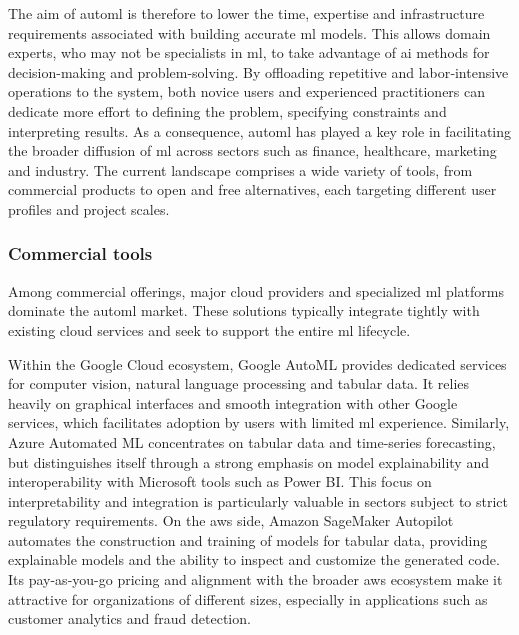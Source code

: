 \documentclass[twoside,final]{Contexto}
\begin{document}
The aim of \gls{automl} is therefore to lower the time, expertise and infrastructure requirements associated with building accurate \gls{ml} models. This allows domain experts, who may not be specialists in \gls{ml}, to take advantage of \gls{ai} methods for decision-making and problem-solving. By offloading repetitive and labor‑intensive operations to the system, both novice users and experienced practitioners can dedicate more effort to defining the problem, specifying constraints and interpreting results. As a consequence, \gls{automl} has played a key role in facilitating the broader diffusion of \gls{ml} across sectors such as finance, healthcare, marketing and industry. The current landscape comprises a wide variety of tools, from commercial products to open and free alternatives, each targeting different user profiles and project scales.

\subsubsection{Commercial tools}

Among commercial offerings, major cloud providers and specialized \gls{ml} platforms dominate the \gls{automl} market. These solutions typically integrate tightly with existing cloud services and seek to support the entire \gls{ml} lifecycle.

Within the Google Cloud ecosystem, Google AutoML \cite{GoogleAutoML} provides dedicated services for computer vision, natural language processing and tabular data. It relies heavily on graphical interfaces and smooth integration with other Google services, which facilitates adoption by users with limited \gls{ml} experience. Similarly, Azure Automated ML \cite{AzureAutomatedML} concentrates on tabular data and time-series forecasting, but distinguishes itself through a strong emphasis on model explainability and interoperability with Microsoft tools such as Power BI. This focus on interpretability and integration is particularly valuable in sectors subject to strict regulatory requirements. On the \gls{aws} side, Amazon SageMaker Autopilot \cite{AmazonSagemakerAutopilot} automates the construction and training of models for tabular data, providing explainable models and the ability to inspect and customize the generated code. Its pay-as-you-go pricing and alignment with the broader \gls{aws} ecosystem make it attractive for organizations of different sizes, especially in applications such as customer analytics and fraud detection.
\end{document}
